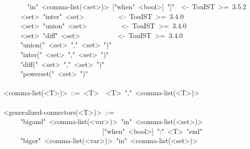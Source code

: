 \begin{footnotesize}
\begin{mdpre}
~~~~~~~"in"~{\textless{}comma-list(\textless{}set\textgreater{})\textgreater{}}~{}["when"~{\textless{}bool\textgreater{}}]~"]"~~{\textless{}-~TouIST~\textgreater{}=~3.5.2}\\
~~~~\textbar{}~{\textless{}set\textgreater{}}~"inter"~{\textless{}set\textgreater{}}~~~~~~~~~~{\textless{}-~TouIST~\textgreater{}=~3.4.0}\\
~~~~\textbar{}~{\textless{}set\textgreater{}}~"union"~{\textless{}set\textgreater{}}~~~~~~~~~~{\textless{}-~TouIST~\textgreater{}=~3.4.0}\\
~~~~\textbar{}~{\textless{}set\textgreater{}}~"diff"~{\textless{}set\textgreater{}}~~~~~~~~~~~{\textless{}-~TouIST~\textgreater{}=~3.4.0}\\
~~~~\textbar{}~"union("~{\textless{}set\textgreater{}}~","~{\textless{}set\textgreater{}}~")"\\
~~~~\textbar{}~"inter("~{\textless{}set\textgreater{}}~","~{\textless{}set\textgreater{}}~")"\\
~~~~\textbar{}~"diff("~{\textless{}set\textgreater{}}~","~{\textless{}set\textgreater{}}~")"\\
~~~~\textbar{}~"powerset("~{\textless{}set\textgreater{}}~")"\\
\\
{\textless{}comma-list(\textless{}T\textgreater{})\textgreater{}}~::=~{\textless{}T\textgreater{}}~\textbar{}~{\textless{}T\textgreater{}}~","~{\textless{}comma-list(\textless{}T\textgreater{})\textgreater{}}\\
\\
{\textless{}generalized-connectors(\textless{}T\textgreater{})\textgreater{}}~::=\\
~~~~\textbar{}~"bigand"~{\textless{}comma-list(\textless{}var\textgreater{})\textgreater{}}~"in"~{\textless{}comma-list(\textless{}set\textgreater{})\textgreater{}}\\
~~~~~~~~~~~~~~~~~~~~~~~~~~~~~{}["when"~{\textless{}bool\textgreater{}}]~":"~{\textless{}T\textgreater{}}~"end"\\
~~~~\textbar{}~"bigor"~{\textless{}comma-list(\textless{}var\textgreater{})\textgreater{}}~"in"~{\textless{}comma-list(\textless{}set\textgreater{})\textgreater{}}\\

\end{mdpre}
\end{footnotesize}

